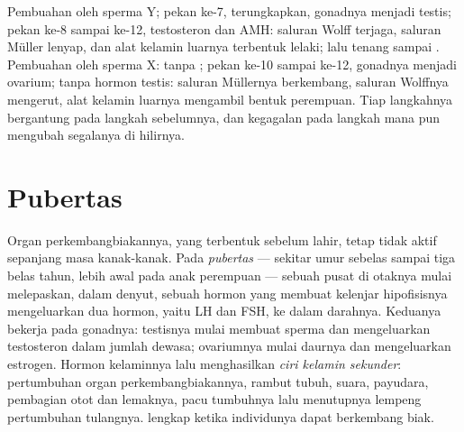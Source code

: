 \begin{example}\label{ex:g11:becoming-male-female:cascade}
Pembuahan oleh sperma  Y; pekan ke-7,  terungkapkan,
gonadnya menjadi testis; pekan ke-8 sampai ke-12, testosteron dan AMH:
saluran Wolff terjaga, saluran Müller lenyap, dan alat kelamin
luarnya terbentuk lelaki; lalu tenang sampai . Pembuahan oleh sperma
 X: tanpa ; pekan ke-10 sampai ke-12, gonadnya menjadi
ovarium; tanpa hormon testis: saluran Müllernya berkembang, saluran
Wolffnya mengerut, alat kelamin luarnya mengambil bentuk perempuan.
Tiap langkahnya bergantung pada langkah sebelumnya, dan kegagalan pada
langkah mana pun mengubah segalanya di hilirnya.
\end{example}

\section{Pubertas}

\begin{proposition}[Pubertas]\label{prop:g11:becoming-male-female:puberty}
Organ perkembangbiakannya, yang terbentuk sebelum lahir, tetap tidak
aktif sepanjang masa kanak-kanak. Pada \emph{pubertas}
--- sekitar umur sebelas sampai tiga belas tahun, lebih awal pada anak
perempuan --- sebuah pusat di otaknya mulai melepaskan, dalam denyut,
sebuah hormon yang membuat kelenjar hipofisisnya mengeluarkan dua
hormon, yaitu LH dan FSH, ke dalam darahnya. Keduanya bekerja pada
gonadnya: testisnya mulai membuat sperma dan mengeluarkan testosteron
dalam jumlah dewasa; ovariumnya mulai daurnya dan mengeluarkan
estrogen. Hormon kelaminnya lalu menghasilkan \emph{ciri kelamin
sekunder}: pertumbuhan organ perkembangbiakannya, rambut tubuh, suara,
payudara, pembagian otot dan lemaknya, pacu tumbuhnya lalu menutupnya
lempeng pertumbuhan tulangnya.  lengkap ketika individunya
dapat berkembang biak.
\end{proposition}
\admitted


